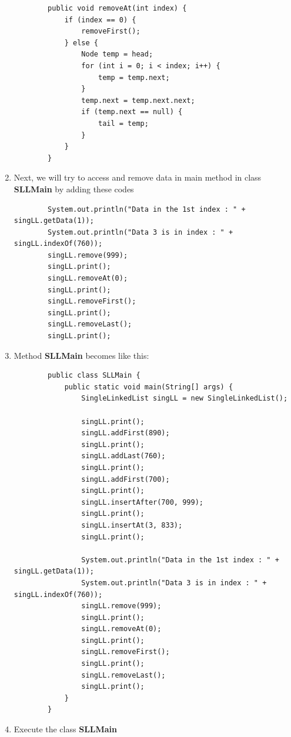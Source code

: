 \documentclass[12pt,titlepage]{article}
\begin{document}
\begin{enumerate}
\begin{verbatim}
        public void removeAt(int index) {
            if (index == 0) {
                removeFirst();
            } else {
                Node temp = head;
                for (int i = 0; i < index; i++) {
                    temp = temp.next;
                }
                temp.next = temp.next.next;
                if (temp.next == null) {
                    tail = temp;
                }
            }
        }
    \end{verbatim}
    \item Next, we will try to access and remove data in main method in class \textbf{SLLMain} by adding these codes
    \begin{verbatim}
        System.out.println("Data in the 1st index : " + singLL.getData(1));
        System.out.println("Data 3 is in index : " + singLL.indexOf(760));
        singLL.remove(999);
        singLL.print();
        singLL.removeAt(0);
        singLL.print();
        singLL.removeFirst();
        singLL.print();
        singLL.removeLast();
        singLL.print();
    \end{verbatim}
    \item Method \textbf{SLLMain} becomes like this:
    \begin{verbatim}
        public class SLLMain {
            public static void main(String[] args) {
                SingleLinkedList singLL = new SingleLinkedList();

                singLL.print();
                singLL.addFirst(890);
                singLL.print();
                singLL.addLast(760);
                singLL.print();
                singLL.addFirst(700);
                singLL.print();
                singLL.insertAfter(700, 999);
                singLL.print();
                singLL.insertAt(3, 833);
                singLL.print();

                System.out.println("Data in the 1st index : " + singLL.getData(1));
                System.out.println("Data 3 is in index : " + singLL.indexOf(760));
                singLL.remove(999);
                singLL.print();
                singLL.removeAt(0);
                singLL.print();
                singLL.removeFirst();
                singLL.print();
                singLL.removeLast();
                singLL.print();
            }
        }
    \end{verbatim}
    \item Execute the class \textbf{SLLMain}
\end{enumerate}
\end{document}
